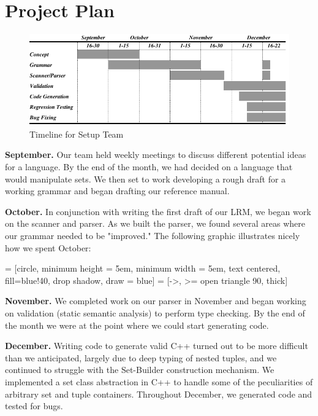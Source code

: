 \chapter{Project Plan}
\begin{figure}[h!]
\includegraphics[scale=.5]{timeline.png}
\caption{Timeline for Setup Team}
\end{figure}

\textbf{September. } Our team held weekly meetings to discuss different potential ideas for a language.  By the end of the month, we had decided on a language that would manipulate sets.  We then set to work developing a rough draft for a working grammar and began drafting our reference manual.

\textbf{October. } In conjunction with writing the first draft of our LRM, we began work on the scanner and parser. As we built the parser, we found several areas where our grammar needed to be "improved."  The following graphic illustrates nicely how we spent October:

 = [circle, minimum height = 5em, minimum width = 5em, text centered, fill=blue!40, drop shadow, draw = blue]
 = [->, >= open triangle 90, thick]

\begin{center}
\end{center}

\textbf{November. } We completed work on our parser in November and began working on validation (static semantic analysis) to perform type checking.  By the end of the month we were at the point where we could start generating code.

\textbf{December. } Writing code to generate valid C++ turned out to be more difficult than we anticipated, largely due to deep typing of nested tuples, and we continued to struggle with the Set-Builder construction mechanism.  We implemented a set class abstraction in C++ to handle some of the peculiarities of arbitrary set and tuple containers. Throughout December, we generated code and tested for bugs.

